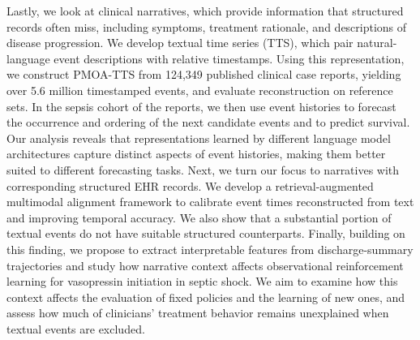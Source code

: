 Lastly, we look at clinical narratives, which provide information that structured records often miss, including symptoms, treatment rationale, and descriptions of disease progression. 
We develop textual time series (TTS), which pair natural-language event descriptions with relative timestamps. 
Using this representation, we construct PMOA-TTS from 124,349 published clinical case reports, yielding over 5.6 million timestamped events, and evaluate reconstruction on reference sets. 
In the sepsis cohort of the reports, we then use event histories to forecast the occurrence and ordering of the next candidate events and to predict survival. 
Our analysis reveals that representations learned by different language model architectures capture distinct aspects of event histories, making them better suited to different forecasting tasks. 
Next, we turn our focus to narratives with corresponding structured EHR records. 
We develop a retrieval-augmented multimodal alignment framework to calibrate event times reconstructed from text and improving temporal accuracy. 
We also show that a substantial portion of textual events do not have suitable structured counterparts. 
Finally, building on this finding, we propose to extract interpretable features from discharge-summary trajectories and study how narrative context affects observational reinforcement learning for vasopressin initiation in septic shock. 
We aim to examine how this context affects the evaluation of fixed policies and the learning of new ones, and assess how much of clinicians' treatment behavior remains unexplained when textual events are excluded.